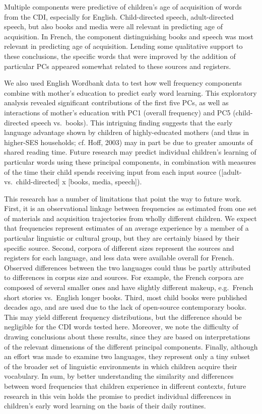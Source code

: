 \documentclass[10pt, letterpaper]{article}
\begin{document}
Multiple components were predictive of children's age of acquisition of
words from the CDI, especially for English. Child-directed speech,
adult-directed speech, but also books and media were all relevant in
predicting age of acquisition. In French, the component distinguishing
books and speech was most relevant in predicting age of acquisition.
Lending some qualitative support to these conclusions, the specific
words that were improved by the addition of particular PCs appeared
somewhat related to these sources and registers.

We also used English Wordbank data to test how well frequency components
combine with mother's education to predict early word learning. This
exploratory analysis revealed significant contributions of the first
five PCs, as well as interactions of mother's education with PC1
(overall frequency) and PC5 (child-directed speech vs.~books). This
intriguing finding suggests that the early language advantage shown by
children of highly-educated mothers (and thus in higher-SES households;
cf. Hoff, 2003) may in part be due to greater amounts of shared reading
time. Future research may predict individual children's learning of
particular words using these principal components, in combination with
measures of the time their child spends receiving input from each input
source ({[}adult- vs.~child-directed{]} x {[}books, media, speech{]}).

This research has a number of limitations that point the way to future
work. First, it is an observational linkage between frequencies as
estimated from one set of materials and acquisition trajectories from
wholly different children. We expect that frequencies represent
estimates of an average experience by a member of a particular
linguistic or cultural group, but they are certainly biased by their
specific source. Second, corpora of different sizes represent the
sources and registers for each language, and less data were available
overall for French. Observed differences between the two languages could
thus be partly attributed to differences in corpus size and sources. For
example, the French corpora are composed of several smaller ones and
have slightly different makeup, e.g.~French short stories vs.~English
longer books. Third, most child books were published decades ago, and
are used due to the lack of open-source contemporary books. This may
yield different frequency distributions, but the difference should be
negligible for the CDI words tested here. Moreover, we note the
difficulty of drawing conclusions about these results, since they are
based on interpretations of the relevant dimensions of the different
principal components. Finally, although an effort was made to examine
two languages, they represent only a tiny subset of the broader set of
linguistic environments in which children acquire their vocabulary. In
sum, by better understanding the similarity and differences between word
frequencies that children experience in different contexts, future
research in this vein holds the promise to predict individual
differences in children's early word learning on the basis of their
daily routines.
\end{document}
